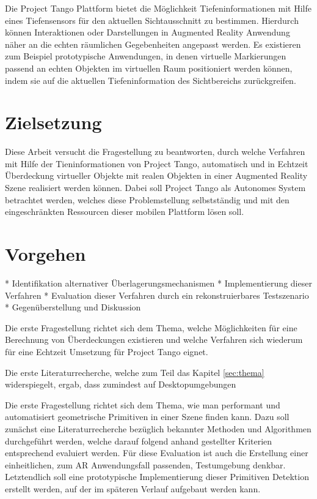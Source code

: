Die Project Tango Plattform bietet die Möglichkeit Tiefeninformationen mit Hilfe eines Tiefensensors für den aktuellen Sichtausschnitt zu bestimmen. Hierdurch können Interaktionen oder Darstellungen in Augmented Reality Anwendung näher an die echten räumlichen Gegebenheiten angepasst werden. Es existieren zum Beispiel prototypische Anwendungen, in denen virtuelle Markierungen passend an echten Objekten im virtuellen Raum positioniert werden können, indem sie auf die aktuellen Tiefeninformation des Sichtbereichs zurückgreifen.\\

\section{Zielsetzung}

Diese Arbeit versucht die Fragestellung zu beantworten, durch welche Verfahren mit Hilfe der Tieninformationen von Project Tango, automatisch und in Echtzeit Überdeckung virtueller Objekte mit realen Objekten in einer Augmented Reality Szene realisiert werden können. Dabei soll Project Tango als Autonomes System betrachtet werden, welches diese Problemstellung selbstständig und mit den eingeschränkten Ressourcen dieser mobilen Plattform lösen soll.\\

\section{Vorgehen}

* Identifikation alternativer Überlagerungsmechanismen
* Implementierung dieser Verfahren
* Evaluation dieser Verfahren durch ein rekonstruierbares Testszenario
* Gegenüberstellung und Diskussion

Die erste Fragestellung richtet sich dem Thema, welche Möglichkeiten für eine Berechnung von Überdeckungen existieren und welche Verfahren sich wiederum für eine Echtzeit Umsetzung für Project Tango eignet. 


Die erste Literaturrecherche, welche zum Teil das Kapitel \ref{sec:thema} widerspiegelt, ergab, dass zumindest auf Desktopumgebungen 


Die erste Fragestellung richtet sich dem Thema, wie man performant und automatisiert geometrische Primitiven in einer Szene  finden kann. Dazu soll zunächst eine Literaturrecherche bezüglich bekannter Methoden und Algorithmen durchgeführt werden, welche darauf folgend anhand gestellter Kriterien entsprechend evaluiert werden. Für diese Evaluation ist auch die Erstellung einer einheitlichen, zum AR Anwendungsfall passenden, Testumgebung denkbar. Letztendlich soll eine prototypische Implementierung dieser Primitiven Detektion erstellt werden, auf der im späteren Verlauf aufgebaut werden kann.\\

